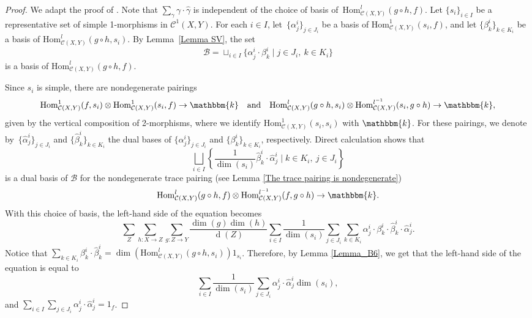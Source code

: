 \documentclass[a4paper, oneside]{amsart}
\DeclareMathOperator{\wdim}{d}
\numberwithin{equation}{subsection}
\theoremstyle{referencedlemma}
\theoremstyle{plain} %
\theoremstyle{remark}
\begin{document}
\begin{proof}
We adapt the proof of \cite[Corollary B.7]{douglas_fusion_2018}.  Note that $\sum_{\gamma} \gamma\cdot \hat{\gamma}$ is independent of the choice of basis of~$\mathrm{Hom}^l_{\mathcal{C}(X,Y)}(g\circ h, f)$. Let $\{s_i\}_{i\in I}$ be a representative set of simple 1-morphisms in $\mathcal{C}^1(X,Y)$.  For each $i\in I$, let~$\{\alpha^i_j\}_{j\in J_i}$ be a basis of $\mathrm{Hom}_{\mathcal{C}(X,Y)}^1(s_i, f)$, and let $\{\beta^i_k\}_{k\in K_i}$ be a basis of $\mathrm{Hom}_{\mathcal{C}(X,Y)}^l(g\circ h, s_i)$.  By Lemma~\ref{Lemma SV}, the set 
$$
\mathcal{B} = \sqcup_{i\in I}\{\alpha^i_j\cdot \beta^i_k \mid j\in J_i, \ k \in K_i \}
$$
is a basis of $\mathrm{Hom}_{\mathcal{C}(X,Y)}^l(g\circ h, f)$.  

Since $s_i$ is simple, there are nondegenerate pairings
$$
\mathrm{Hom}_{\mathcal{C}(X,Y)}^1(f, s_i) \otimes \mathrm{Hom}_{\mathcal{C}(X,Y)}^1(s_i, f)\to \mathbbm{k} \quad \text{and} \quad  \mathrm{Hom}_{\mathcal{C}(X,Y)}^l(g\circ h, s_i) \otimes \mathrm{Hom}_{\mathcal{C}(X,Y)}^{l^{-1}}(s_i, g\circ h)\to \mathbbm{k},
$$
given by the vertical composition of 2-morphisms, where we identify $\mathrm{Hom}_{\mathcal{C}(X,Y)}^1(s_i, s_i)$ with $\mathbbm{k}$.  For these pairings, we denote by~$\{\widehat{\alpha}^i_j\}_{j\in J_i}$ and $\{\widehat{\beta}^i_k\}_{k\in K_i}$ the dual bases of $\{\alpha^i_j\}_{j\in J_i}$ and $\{\beta^i_k\}_{k\in K_i}$, respectively. Direct calculation shows that 
$$
\bigsqcup_{i\in I} \left\{\frac{1}{\dim(s_i)}\widehat{\beta}^i_k\cdot \widehat{\alpha}^i_j \mid k\in K_i, \ j\in J_i\right\}
$$
is a dual basis of $\mathcal{B}$ for the nondegenerate trace pairing (see Lemma \ref{The trace pairing is nondegenerate})
$$
\mathrm{Hom}_{\mathcal{C}(X,Y)}^l(g\circ h, f) \otimes \mathrm{Hom}_{\mathcal{C}(X,Y)}^{l^{-1}}(f, g\circ h)\to \mathbbm{k}.
$$
With this choice of basis, the left-hand side of the equation becomes
$$
\sum_Z  \sum_{h\colon X\to Z} \sum_{g\colon Z\to Y} \frac{\dim(g)\dim(h)}{\wdim(Z)}\sum_{i\in I}\frac{1}{\dim(s_i)}\sum_{j\in J_i}\sum_{k\in K_i}\alpha^i_j\cdot  \beta^i_k\cdot  \widehat{\beta}^i_k\cdot  \widehat{\alpha}^i_j.
$$
Notice that $\sum_{k\in K_i} \beta^i_k\cdot  \widehat{\beta}^i_k = \dim(\mathrm{Hom}_{\mathcal{C}(X,Y)}^l(g\circ h, s_i))1_{s_i}$. Therefore, by Lemma \ref{Lemma_B6}, we get that the left-hand side of the equation is equal to 
$$
\sum_{i\in I}\frac{1}{\dim(s_i)}\sum_{j\in J_i} \alpha^i_j\cdot\widehat{\alpha}^i_j \dim(s_i),
$$
and $\sum_{i\in I}\sum_{j\in J_i} \alpha^i_j\cdot\widehat{\alpha}^i_j = 1_f$. 
\end{proof}
\end{document}
